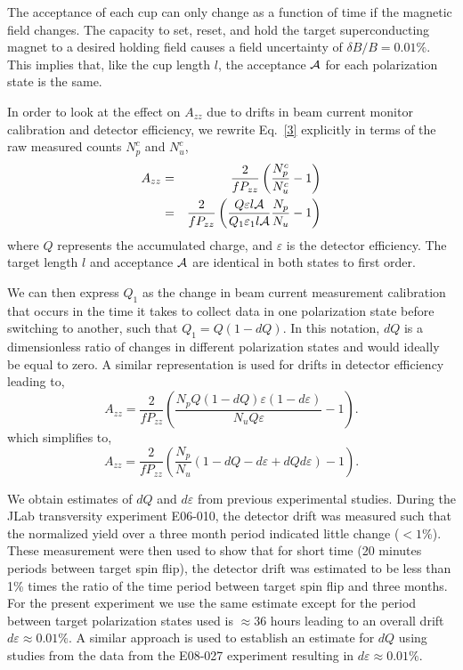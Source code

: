 The acceptance of each cup can only change as a function of time if the magnetic field changes.  
The capacity to set, reset, and hold the target superconducting magnet to a desired holding field causes a field uncertainty of $\delta B /B=0.01\%$. 
This implies that, like the cup length $l$, the acceptance ${\cal A}$ for each polarization state is the same.

In order to look at the effect on $A_{zz}$ due to drifts in beam current monitor calibration and detector efficiency, we rewrite Eq.~\ref{3} explicitly in terms of the raw measured counts $N_p^c$ and $N_u^c$,
\begin{eqnarray} \label{3c}
\nonumber
A_{zz}&=&\frac{2}{fP_{zz}}\left(\frac{N^c_p}{N^c_u}-1\right) \\
      &=&\frac{2}{fP_{zz}}\left(\frac{Q\varepsilon l \cal{A}}{Q_1\varepsilon_1 l \cal{A}}\frac{N_p}{N_u}-1\right)
\end{eqnarray}
where $Q$ represents the accumulated charge, and $\varepsilon$ is the detector efficiency. The target length $l$ and acceptance $\cal{A}$ are identical in both states to first order.

We can then express $Q_1$ as the change in beam current measurement calibration that occurs in
the time it takes to collect data in one polarization state before switching to another, such that $Q_1=Q(1-dQ)$.
In this notation, $dQ$ is a dimensionless ratio of changes in different polarization states and would ideally be equal to zero.  A similar representation
is used for drifts in detector efficiency leading to,
\begin{equation}
A_{zz}=\frac{2}{fP_{zz}}\left(\frac{N_pQ(1-dQ)\varepsilon(1-d\varepsilon)}{N_u Q\varepsilon}-1\right).
\end{equation}
which simplifies to,
\begin{equation}
A_{zz}=\frac{2}{fP_{zz}}\left(\frac{N_p}{N_u}(1-dQ-d\varepsilon+dQd\varepsilon)-1\right).
\end{equation}

We obtain estimates of $dQ$ and $d\varepsilon$ from previous experimental
studies.  During the JLab transversity experiment E06-010, the detector drift was measured such that the normalized yield over a three month period indicated little change ($<1$\%).
These measurement were then used to show that for short time (20 minutes periods between target spin flip),
the detector drift was estimated to be less than 1\% times the ratio of the time period between target spin flip and three months.
For the present experiment we use the same estimate except for the period between target polarization states used is
$\approx 36$ hours leading to an overall drift $d\varepsilon\approx 0.01\%$.  A similar approach is used to establish an estimate
for $dQ$ using studies from the data from the E08-027 experiment resulting in $d\varepsilon \approx 0.01\%$.

